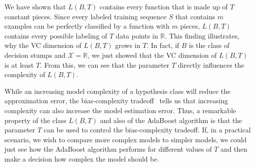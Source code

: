 We have shown that $L(B, T)$ contains every function that is made up of $T$ constant pieces. Since every labeled
training sequence $S$ that contains $m$ examples can be perfectly classified by a function with $m$ pieces,
$L(B, T)$ contains every possible labeling of $T$ data points in $\mathbb{R}$.
This finding illustrates, why the VC dimension of
$L(B, T)$ grows in $T$. In fact, if $B$ is the class of decision stumps and $\mathcal{X} = \mathbb{R}$,
we just showed that the VC dimension of $L(B, T)$ is at least $T$.
From this, we can see that the parameter $T$ directly influences the complexity of $L(B, T)$.

While an increasing model complexity of a hypothesis class will reduce the approximation error, the bias-complexity
tradeoff~\cite{SSBD14} tells us that increasing complexity can also increase the model estimation error.
Thus, a remarkable property of the class $L(B, T)$ and also of the AdaBoost algorithm is that the parameter
$T$ can be used to control the bias-complexity tradeoff.
If, in a practical scenario, we wish to compare more complex models to simpler models, we could just see how the
AdaBoost algorithm performs for different values of $T$ and then make a decision how complex the model should be.
